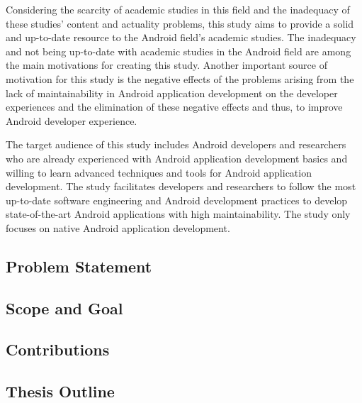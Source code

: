 Considering the scarcity of academic studies in this field and the inadequacy of these studies' content and actuality problems, this study aims to provide a solid and up-to-date resource to the Android field's academic studies. The inadequacy and not being up-to-date with academic studies in the Android field are among the main motivations for creating this study. Another important source of motivation for this study is the negative effects of the problems arising from the lack of maintainability in Android application development on the developer experiences and the elimination of these negative effects and thus, to improve  Android developer experience.

The target audience of this study includes Android developers and researchers who are already experienced with Android application development basics and willing to learn advanced techniques and tools for Android application development. The study facilitates developers and researchers to follow the most up-to-date software engineering and Android development practices to develop state-of-the-art Android applications with high maintainability. The study only focuses on native Android application development.

\subsection{Problem Statement}
\label{section:1.1}


\subsection{Scope and Goal}


\subsection{Contributions}


\subsection{Thesis Outline}
